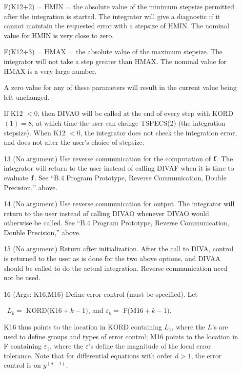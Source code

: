 \documentclass[twoside]{MATH77}
\begin{document}
\begin{itemize}
F(K12+2) = HMIN = the absolute value of the minimum stepsize permitted
after the integration is started. The integrator will give a diagnostic if
it cannot maintain the requested error with a stepsize of HMIN. The nominal
value for HMIN is very close to zero.

F(K12+3) = HMAX = the absolute value of the maximum stepsize. The
integrator will not take a step greater than HMAX. The nominal value for
HMAX is a very large number.

A zero value for any of these parameters will result in the current value
being left unchanged.

If K12 $<0$, then DIVAO will be called at the end of every step with KORD$%
(1)=8$, at which time the user can change TSPECS(2) (the integration
stepsize). When K12 $<0$, the integrator does not check the
integration error, and does not alter the user's choice of stepsize.

\item[13]  (No argument) Use reverse communication for the computation of $%
{\bf f}$. The integrator will return to the user instead of calling
DIVAF when it is time to evaluate ${\bf f}$. See ``B.4 Program Prototype,
Reverse Communication, Double Precision,'' above.

\item[14]  (No argument) Use reverse communication for output.  The
integrator will return to the user instead of calling DIVAO whenever DIVAO
would otherwise be called. See ``B.4 Program Prototype, Reverse
Communication, Double Precision,'' above.

\item[15]  (No argument) Return after initialization. After the call to
DIVA, control is returned to the user as is done for the two above options,
and DIVAA should be called to do the actual integration. Reverse
communication need not be used.

\item[16]  (Args: K16,M16) Define error control (must be specified). Let

\ $L_k=$ KORD(K1$6+k-1)$, and $\varepsilon _k=$ F(M$16+k-1).$

K16 thus points to the location in KORD containing $L_1$, where the $%
L$'s are used to define groups and types of error control; M16
points to the location in F containing $\varepsilon _1$, where the $%
\varepsilon $'s define the magnitude of the local error tolerance.
Note that for differential equations with order $d>1$, the error control is
on $y^{(d-1)}$.


\end{itemize}
\end{document}
